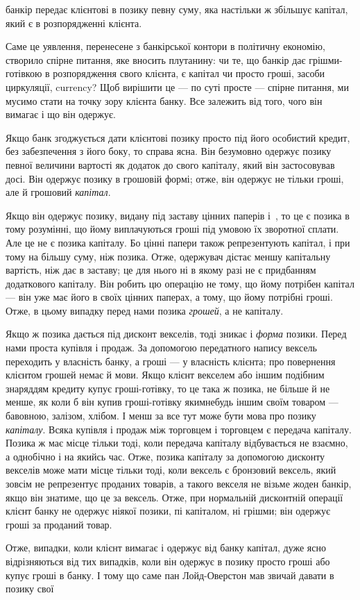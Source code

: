 \parcont{}  %
банкір передає клієнтові в позику певну суму, яка настільки ж
збільшує капітал, який є в розпорядженні клієнта.

Саме це уявлення, перенесене з банкірської контори в політичну економію, створило спірне питання,
яке вносить плутанину: чи те, що банкір дає грішми-готівкою в розпорядження
свого клієнта, є капітал чи просто гроші, засоби циркуляції,
currency? Щоб вирішити це — по суті просте — спірне питання,
ми мусимо стати на точку зору клієнта банку. Все залежить
від того, чого він вимагає і що він одержує.

Якщо банк згоджується дати клієнтові позику просто під
його особистий кредит, без забезпечення з його боку, то справа
ясна. Він безумовно одержує позику певної величини вартості
як додаток до свого капіталу, який він застосовував досі. Він
одержує позику в грошовій формі; отже, він одержує не тільки
гроші, але й грошовий \emph{капітал}.

Якщо він одержує позику, видану під заставу цінних паперів і~, то це є позика в тому розумінні,
що йому виплачуються гроші під умовою їх зворотної сплати. Але це не є
позика капіталу. Бо цінні папери також репрезентують капітал,
і при тому на більшу суму, ніж позика. Отже, одержувач дістає меншу капітальну вартість, ніж дає в
заставу; це для нього
ні в якому разі не є придбанням додаткового капіталу. Він робить цю операцію не тому, що йому
потрібен капітал — він уже
має його в своїх цінних паперах, а тому, що йому потрібні гроші.
Отже, в цьому випадку перед нами позика \emph{грошей}, а не капіталу.

Якщо ж позика дається під дисконт векселів, тоді зникає і \emph{форма}
позики. Перед нами проста купівля і продаж. За допомогою передатного напису вексель переходить у
власність банку, а гроші — у власність клієнта; про повернення клієнтом грошей немає й мови. Якщо
клієнт векселем або іншим подібним знаряддям
кредиту купує гроші-готівку, то це така ж позика, не більше
й не менше, як коли б він купив гроші-готівку якимнебудь
іншим своїм товаром — бавовною, залізом, хлібом. І менш за
все тут може бути мова про позику \emph{капіталу}. Всяка купівля і продаж між торговцем і торговцем є
передача капіталу.
Позика ж має місце тільки тоді, коли передача капіталу відбувається не взаємно, а однобічно і на
якийсь час. Отже, позика
капіталу за допомогою дисконту векселів може мати місце
тільки тоді, коли вексель є бронзовий вексель, який зовсім не
репрезентує проданих товарів, а такого векселя не візьме жоден
банкір, якщо він знатиме, що це за вексель. Отже, при нормальній дисконтній операції клієнт банку не
одержує ніякої позики,
пі капіталом, ні грішми; він одержує гроші за проданий товар.

Отже, випадки, коли клієнт вимагає і одержує від банку
капітал, дуже ясно відрізняються від тих випадків, коли він
одержує в позику просто гроші або купує гроші в банку. І тому
що саме пан Лойд-Оверстон мав звичай давати в позику свої
\parbreak{}  %
